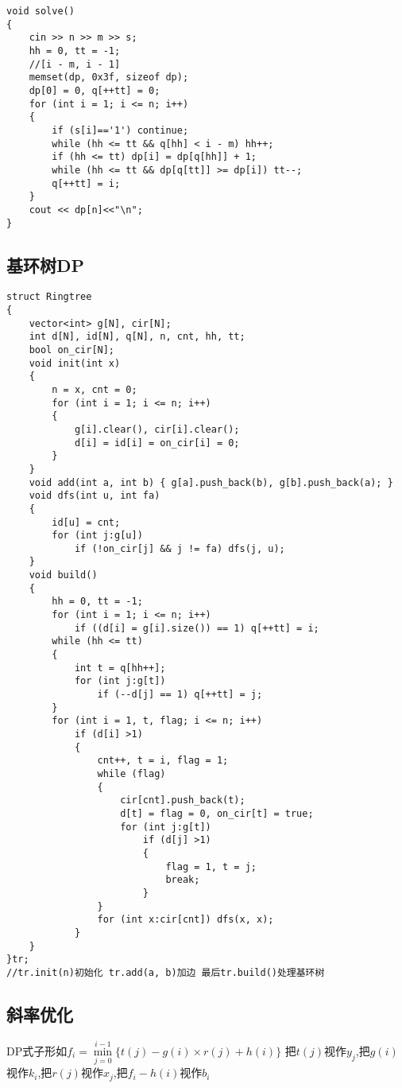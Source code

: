 \documentclass[a4paper, fontset=none]{ctexart}
\begin{document}
\begin{verbatim}
void solve()
{
    cin >> n >> m >> s;
    hh = 0, tt = -1;
    //[i - m, i - 1]
    memset(dp, 0x3f, sizeof dp);
    dp[0] = 0, q[++tt] = 0;
    for (int i = 1; i <= n; i++)
    {
        if (s[i]=='1') continue;
        while (hh <= tt && q[hh] < i - m) hh++;
        if (hh <= tt) dp[i] = dp[q[hh]] + 1;
        while (hh <= tt && dp[q[tt]] >= dp[i]) tt--;
        q[++tt] = i;
    }
    cout << dp[n]<<"\n";
}
\end{verbatim}
\subsection{基环树DP}

\begin{verbatim}
struct Ringtree
{
    vector<int> g[N], cir[N];
    int d[N], id[N], q[N], n, cnt, hh, tt;
    bool on_cir[N];
    void init(int x)
    {
        n = x, cnt = 0;
        for (int i = 1; i <= n; i++)
        {
            g[i].clear(), cir[i].clear();
            d[i] = id[i] = on_cir[i] = 0;
        }
    }
    void add(int a, int b) { g[a].push_back(b), g[b].push_back(a); }
    void dfs(int u, int fa)
    {
        id[u] = cnt;
        for (int j:g[u])
            if (!on_cir[j] && j != fa) dfs(j, u);
    }
    void build()
    {
        hh = 0, tt = -1;
        for (int i = 1; i <= n; i++)
            if ((d[i] = g[i].size()) == 1) q[++tt] = i;
        while (hh <= tt)
        {
            int t = q[hh++];
            for (int j:g[t])
                if (--d[j] == 1) q[++tt] = j;
        }
        for (int i = 1, t, flag; i <= n; i++)
            if (d[i] >1)
            {
                cnt++, t = i, flag = 1;
                while (flag)
                {
                    cir[cnt].push_back(t);
                    d[t] = flag = 0, on_cir[t] = true;
                    for (int j:g[t])
                        if (d[j] >1)
                        {
                            flag = 1, t = j;
                            break;
                        }
                }
                for (int x:cir[cnt]) dfs(x, x);
            }
    }
}tr;
//tr.init(n)初始化 tr.add(a, b)加边 最后tr.build()处理基环树
\end{verbatim}
\subsection{斜率优化}

DP式子形如$f_i=\min\limits_{j=0}^{i-1} \{t(j)-g(i)\times r(j)+h(i)\}$ 把$t(j)$视作$y_j$,把$g(i)$视作$k_i$,把$r(j)$视作$x_j$,把$f_i-h(i)$视作$b_i$
\end{document}
